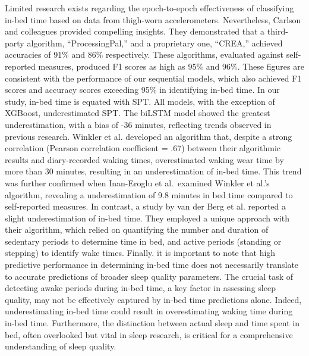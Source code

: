 \documentclass[
  super,
  preprint,
  3p]{elsarticle}
\begin{document}
Limited research exists regarding the epoch-to-epoch effectiveness of
classifying in-bed time based on data from thigh-worn accelerometers.
Nevertheless, Carlson and colleagues provided compelling insights. They
demonstrated that a third-party algorithm, ``ProcessingPal,'' and a
proprietary one, ``CREA,'' achieved accuracies of 91\% and 86\%
respectively. These algorithms, evaluated against self-reported
measures\citep{carlson2021}, produced F1 scores as high as 95\% and
96\%. These figures are consistent with the performance of our
sequential models, which also achieved F1 scores and accuracy scores
exceeding 95\% in identifying in-bed time. In our study, in-bed time is
equated with SPT. All models, with the exception of XGBoost,
underestimated SPT. The biLSTM model showed the greatest
underestimation, with a bias of -36 minutes, reflecting trends observed
in previous research. Winkler et al. developed an algorithm that,
despite a strong correlation (Pearson correlation coefficient = .67)
between their algorithmic results and diary-recorded waking times,
overestimated waking wear time by more than 30 minutes, resulting in an
underestimation of in-bed time\citep{winkler2016}. This trend was
further confirmed when Inan-Eroglu et al.~examined Winkler et al.'s
algorithm, revealing a underestimation of 9.8 minutes in bed time
compared to self-reported measures\citep{inan-eroglu2021}. In contrast,
a study by van der Berg et al. reported a slight underestimation of
in-bed time. They employed a unique approach with their algorithm, which
relied on quantifying the number and duration of sedentary periods to
determine time in bed, and active periods (standing or stepping) to
identify wake times\citep{vanderberg2016}. Finally. it is important to
note that high predictive performance in determining in-bed time does
not necessarily translate to accurate predictions of broader sleep
quality parameters. The crucial task of detecting awake periods during
in-bed time, a key factor in assessing sleep quality, may not be
effectively captured by in-bed time predictions alone. Indeed,
underestimating in-bed time could result in overestimating waking time
during in-bed time. Furthermore, the distinction between actual sleep
and time spent in bed, often overlooked but vital in sleep research, is
critical for a comprehensive understanding of sleep quality.
\end{document}
